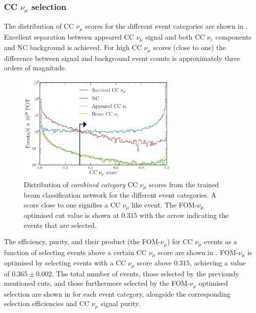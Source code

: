 \subsubsection*{CC $\nu_{\mu}$ selection} %

The distribution of CC $\nu_{\mu}$ scores for the different event categories are shown in
. Excellent separation between appeared CC $\nu_{\mu}$
signal and both CC $\nu_{e}$ components and NC background is achieved. For high CC $\nu_{\mu}$
scores (close to one) the difference between signal and background event counts is approximately
three orders of magnitude.

\begin{figure} %
    \includegraphics[width=0.7\textwidth]{diagrams/7-results/final_beam_numu_outputs.pdf}
    \caption[Distribution of CC $\nu_{\mu}$ scores from the trained beam classification network]
    {Distribution of \emph{combined category} CC $\nu_{\mu}$ scores from the trained beam
        classification network for the different event categories. A score close to one signifies
        a CC $\nu_{\mu}$ like event. The FOM-$\nu_{\mu}$ optimised cut value is shown at $0.315$
        with the arrow indicating the events that are selected.}
    \label{fig:final_beam_numu_outputs}
\end{figure}

The efficiency, purity, and their product (the FOM-$\nu_{\mu}$) for CC $\nu_{\mu}$ events as a
function of selecting events above a certain CC $\nu_{\mu}$ score are shown in
. FOM-$\nu_{\mu}$ is optimised by selecting events with a CC
$\nu_{\mu}$ score above $0.315$, achieving a value of $0.365\pm0.002$. The total number of events,
those selected by the previously mentioned cuts, and those furthermore selected by the
FOM-$\nu_{\mu}$ optimised selection are shown in  for each event
category, alongside the corresponding selection efficiencies and CC $\nu_{\mu}$ signal purity.

